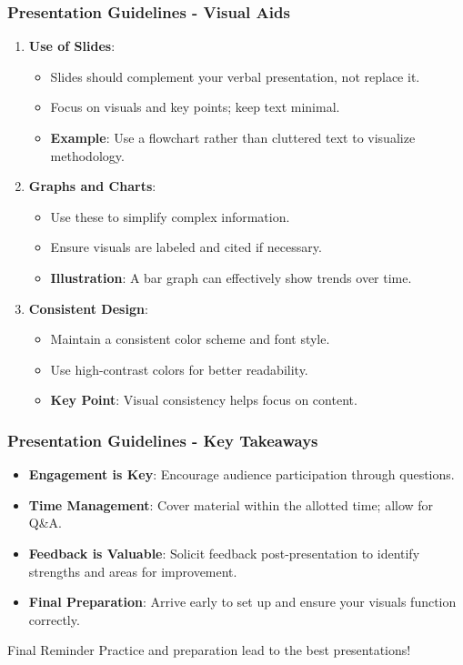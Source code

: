 \documentclass[aspectratio=169]{beamer}
\begin{document}
\begin{frame}[fragile]
    \frametitle{Presentation Guidelines - Visual Aids}
    \begin{enumerate}
        \item \textbf{Use of Slides}:
            \begin{itemize}
                \item Slides should complement your verbal presentation, not replace it. 
                \item Focus on visuals and key points; keep text minimal.
                \item \textbf{Example}: Use a flowchart rather than cluttered text to visualize methodology.
            \end{itemize}
        
        \item \textbf{Graphs and Charts}:
            \begin{itemize}
                \item Use these to simplify complex information.
                \item Ensure visuals are labeled and cited if necessary.
                \item \textbf{Illustration}: A bar graph can effectively show trends over time.
            \end{itemize}
        
        \item \textbf{Consistent Design}:
            \begin{itemize}
                \item Maintain a consistent color scheme and font style.
                \item Use high-contrast colors for better readability.
                \item \textbf{Key Point}: Visual consistency helps focus on content.
            \end{itemize}
    \end{enumerate}
\end{frame}

\begin{frame}[fragile]
    \frametitle{Presentation Guidelines - Key Takeaways}
    \begin{itemize}
        \item \textbf{Engagement is Key}: Encourage audience participation through questions.
        \item \textbf{Time Management}: Cover material within the allotted time; allow for Q\&A.
        \item \textbf{Feedback is Valuable}: Solicit feedback post-presentation to identify strengths and areas for improvement.
        \item \textbf{Final Preparation}: Arrive early to set up and ensure your visuals function correctly.
    \end{itemize}
    \begin{block}{Final Reminder}
        Practice and preparation lead to the best presentations!
    \end{block}
\end{frame}
\end{document}
